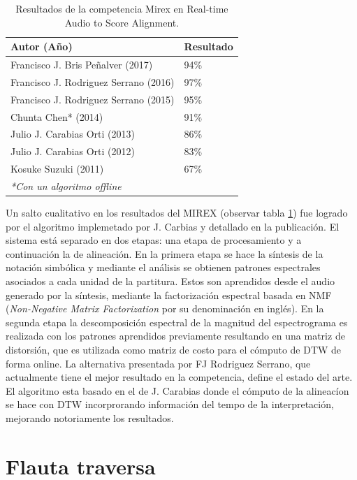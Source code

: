 \documentclass
  [ams,pdfout]%
	{aeslac}
\begin{document}
\begin{table}[!ht]
\caption{Resultados de la competencia Mirex en Real-time  Audio to Score Alignment.}
\label{tab:Mirex}
\vspace*{10pt}
\centering
\small
\begin{tabular}{ll}
\textbf{Autor (Año)}	&	\textbf{Resultado}\\ \hline
Francisco J. Bris Peñalver (2017)     & 94\%   \\
Francisco J. Rodriguez Serrano (2016) & 97\%   \\
Francisco J. Rodriguez Serrano (2015) & 95\%   \\
Chunta Chen* (2014)                   & 91\%   \\
Julio J. Carabias Orti (2013)         & 86\%   \\
Julio J. Carabias Orti (2012)         & 83\%   \\
Kosuke Suzuki (2011)                  & 67\%   \\
\textit{*Con un algoritmo offline}
\end{tabular}
\end{table}


Un salto cualitativo en los resultados del MIREX (observar tabla \ref{tab:Mirex}) fue logrado por el algoritmo implemetado por J. Carbias y detallado en la publicación\cite{carabias2015audio}. El sistema está separado en dos etapas: una etapa de procesamiento y a continuación la de alineación. En la primera etapa se hace la síntesis de la notación simbólica y mediante el análisis se obtienen patrones espectrales asociados a cada unidad de la partitura. Estos son aprendidos desde el audio generado por la síntesis, mediante la factorización espectral basada en NMF (\textit{Non-Negative Matrix Factorization} por su denominación en inglés). En la segunda etapa la descomposición espectral de la magnitud del espectrograma es realizada con los patrones aprendidos previamente resultando en una matriz de distorsión, que es utilizada como matriz de costo para el cómputo de DTW de forma online. La alternativa presentada por FJ Rodriguez Serrano\cite{rodriguez2017tempo}, que actualmente tiene el mejor resultado en la competencia, define el estado del arte. El algoritmo esta basado en el de J. Carabias donde el cómputo de la alineacíon se hace con DTW incorprorando información del tempo de la interpretación, mejorando notoriamente los resultados.

%
\section{Flauta traversa}
\end{document}
